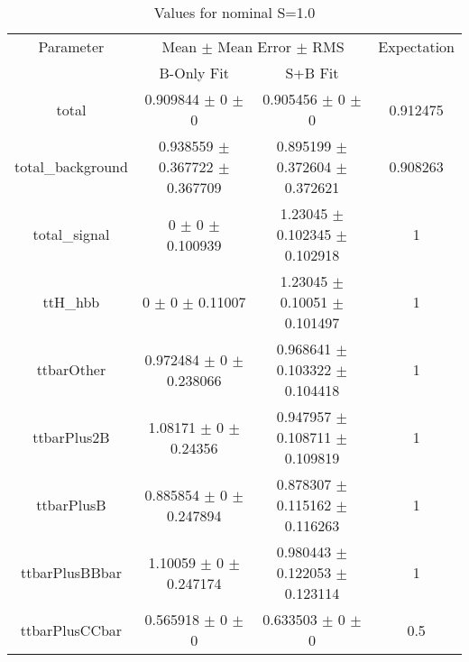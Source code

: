\begin{table}
\centering
\caption{Values for nominal S=1.0}
\begin{tabular}{cccc}
\toprule
Parameter & \multicolumn{2}{c}{Mean $\pm$ Mean Error $\pm$ RMS} & Expectation\\
 & B-Only Fit & S+B Fit & \\
\midrule
total & \num{0.909844} $\pm$ \num{0} $\pm$ \num{0} & \num{0.905456} $\pm$ \num{0} $\pm$ \num{0} & \num{0.912475}\\
total\_background & \num{0.938559} $\pm$ \num{0.367722} $\pm$ \num{0.367709} & \num{0.895199} $\pm$ \num{0.372604} $\pm$ \num{0.372621} & \num{0.908263}\\
total\_signal & \num{0} $\pm$ \num{0} $\pm$ \num{0.100939} & \num{1.23045} $\pm$ \num{0.102345} $\pm$ \num{0.102918} & \num{1}\\
ttH\_hbb & \num{0} $\pm$ \num{0} $\pm$ \num{0.11007} & \num{1.23045} $\pm$ \num{0.10051} $\pm$ \num{0.101497} & \num{1}\\
ttbarOther & \num{0.972484} $\pm$ \num{0} $\pm$ \num{0.238066} & \num{0.968641} $\pm$ \num{0.103322} $\pm$ \num{0.104418} & \num{1}\\
ttbarPlus2B & \num{1.08171} $\pm$ \num{0} $\pm$ \num{0.24356} & \num{0.947957} $\pm$ \num{0.108711} $\pm$ \num{0.109819} & \num{1}\\
ttbarPlusB & \num{0.885854} $\pm$ \num{0} $\pm$ \num{0.247894} & \num{0.878307} $\pm$ \num{0.115162} $\pm$ \num{0.116263} & \num{1}\\
ttbarPlusBBbar & \num{1.10059} $\pm$ \num{0} $\pm$ \num{0.247174} & \num{0.980443} $\pm$ \num{0.122053} $\pm$ \num{0.123114} & \num{1}\\
ttbarPlusCCbar & \num{0.565918} $\pm$ \num{0} $\pm$ \num{0} & \num{0.633503} $\pm$ \num{0} $\pm$ \num{0} & \num{0.5}\\
\bottomrule
\end{tabular}
\end{table}